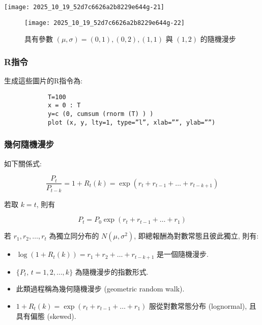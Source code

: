 \documentclass[letterpaper]{article}
\begin{document}
		
		\texttt{[image: 2025\_10\_19\_52d7c6626a2b8229e644g-21]}
		
		\begin{figure}[h]
			\begin{center}
				\texttt{[image: 2025\_10\_19\_52d7c6626a2b8229e644g-22]}
				\caption{ 具有參數 \( (\mu, \sigma) = (0, 1) ,  (0, 2) ,  (1, 1) \) 與 \( (1, 2) \) 的隨機漫步}
			\end{center}
		\end{figure}
		
		\subsubsection{R指令}
		生成這些圖片的R指令為: 
		
		\begin{verbatim}
			T=100
			x = 0 : T
			y=c (0, cumsum (rnorm (T) ) ) 
			plot (x, y, lty=1, type=”l”, xlab=””, ylab=””) 
		\end{verbatim}
		
		
		\subsubsection{幾何隨機漫步}
		如下關係式: 
		
		\[
		\frac{P_{t}}{P_{t-k}} = 1 + R_{t} (k) = \exp \left ( r_{t} + r_{t-1} + \ldots + r_{t-k+1} \right) 
		\]
		
		若取 \( k = t \), 則有
		
		\[
		P_{t} = P_{0} \exp \left ( r_{t} + r_{t-1} + \ldots + r_{1} \right) 
		\]
		
		若 \( r_{1}, r_{2}, \ldots, r_{t} \) 為獨立同分布的 \( N (\mu, \sigma^{2}) \), 即總報酬為對數常態且彼此獨立, 則有: 
		
		
		\begin{itemize}
			\item \(\log \left (1 + R_{t} (k) \right) = r_{1} + r_{2} + \ldots + r_{t-k+1}\) 是一個隨機漫步.
			\item \(\{ P_{t}, \, t = 1, 2, \ldots, k \}\) 為隨機漫步的指數形式. 
			\item 此類過程稱為幾何隨機漫步 (geometric random walk).
			\item \(1 + R_{t} (k) = \exp \left ( r_{t} + r_{t-1} + \ldots + r_{1} \right) \) 服從對數常態分布 (lognormal), 且具有偏態 (skewed). 
		\end{itemize}
		
\end{document}
